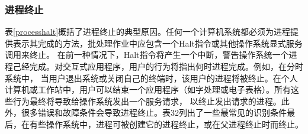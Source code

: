 \documentclass[a4paper, 11pt]{article} %
\begin{document}
\subsubsection{进程终止}
表\ref{processhalt}概括了进程终止的典型原因。任何一个计算机系统都必须为进程提供表示其完成的方法，批处理作业中应包含一个Halt指令或其他操作系统显式服务调用来终止。
在前一种情况下，Halt指令将产生一个中断，警告操作系统一个进程己经完成。对交互式应用程序，用户的行为将指出何时进程完成。例如，在分时系统中，
当用户退出系统或关闭自己的终端时，该用户的进程将被终止。在个人计算机或工作站中，用户可以结束一个应用程序（如字处理或电子表格）。所有这些行为最终将导致给操作系统发出一个服务请求，
以终止发出请求的进程。此外，很多错误和故障条件会导致进程终止。表32列出了一些最常见的识别条件最后，在有些操作系统中，进程可被创建它的进程终止，或在父进程终止时而终止。
\end{document}
